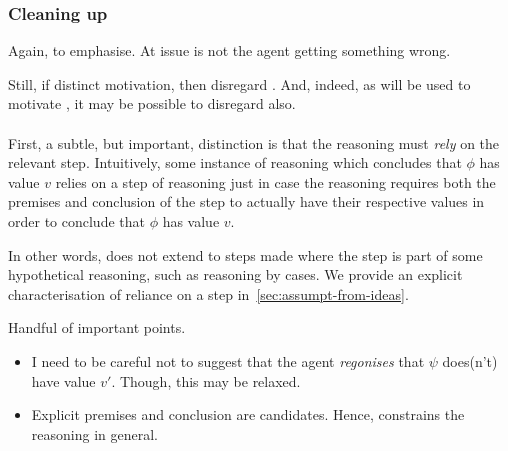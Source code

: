 \subsubsection{Cleaning up}
\label{sec:cleaning-up}

\begin{note}
  Again, to emphasise.
  At issue is not the agent getting something wrong.

  Still, if distinct motivation, then disregard \ideaS{}.
  And, indeed, as \ideaCS{} will be used to motivate \ideaCSC{}, it may be possible to disregard \ideaCS{} also.
\end{note}

\paragraph{\ideaCS{}}

\begin{note}[Relying]
  First, a subtle, but important, distinction is that the reasoning must \emph{rely} on the relevant step.
  Intuitively, some instance of reasoning which concludes that \(\phi\) has value \(v\) relies on a step of reasoning just in case the reasoning requires both the premises and conclusion of the step to actually have their respective values in order to conclude that \(\phi\) has value \(v\).

  In other words, \ideaCS{} does not extend to steps made where the step is part of some hypothetical reasoning, such as reasoning by cases.
  We provide an explicit characterisation of reliance on a step in~\autoref{sec:assumpt-from-ideas}.
\end{note}

\begin{note}
  Handful of important points.
  \begin{itemize}
  \item I need to be careful not to suggest that the agent \emph{regonises} that \(\psi\) does(n't) have value \(v'\).
    Though, this may be relaxed.
  \item Explicit premises and conclusion are candidates.
  Hence, \label{idea:CS:B:step:requ} constrains the reasoning in general.
  \end{itemize}
\end{note}

